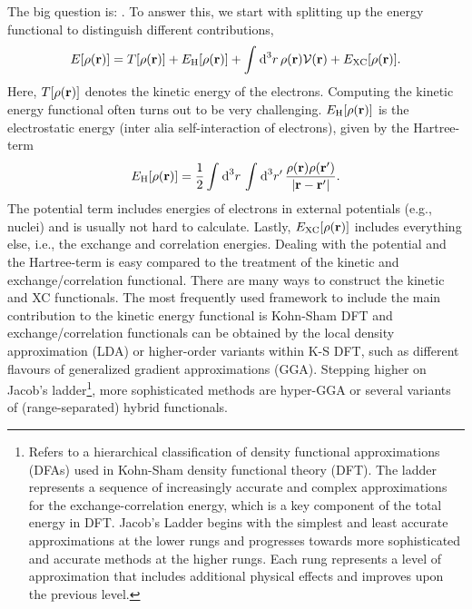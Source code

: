 \documentclass[../../main.tex]{subfiles}
\begin{document}
The big question is: . To answer this, we start with splitting up the energy functional to distinguish different contributions,
\begin{align}
	E[\rho(\textbf{r})]=T[\rho(\textbf{r})]+E_{\text{H}}[\rho(\textbf{r})]+\int_{}^{}\text{d}^3r\,\rho(\textbf{r})\mathcal{V}(\textbf{r})+E_{\text{XC}}[\rho(\textbf{r})].
\end{align}
Here, $T[\rho(\textbf{r})]$ denotes the kinetic energy of the electrons. Computing the kinetic energy functional often turns out to be very challenging. $E_{\text{H}}[\rho(\textbf{r})]$ is the electrostatic energy (inter alia self-interaction of electrons), given by the Hartree-term
\begin{align}
	E_{\text{H}}[\rho(\textbf{r})]=\frac 12\int_{}^{}\text{d}^3r\,\int_{}^{}\text{d}^3r'\,\frac{\rho(\textbf{r})\rho(\textbf{r}')}{|\textbf{r}-\textbf{r}'|}.
\end{align}
The potential term includes energies of electrons in external potentials (e.g., nuclei) and is usually not hard to calculate. Lastly, $E_{\text{XC}}[\rho(\textbf{r})]$ includes everything else, i.e., the exchange and correlation energies. Dealing with the potential and the Hartree-term is easy compared to the treatment of the kinetic and exchange/correlation functional. There are many ways to construct the kinetic and XC functionals. The most frequently used framework to include the main contribution to the kinetic energy functional is Kohn-Sham DFT and exchange/correlation functionals can be obtained by the local density approximation (LDA) or higher-order variants within K-S DFT, such as different flavours of generalized gradient approximations (GGA). Stepping higher on Jacob's ladder\footnote{Refers to a hierarchical classification of density functional approximations (DFAs) used in Kohn-Sham density functional theory (DFT). The ladder represents a sequence of increasingly accurate and complex approximations for the exchange-correlation energy, which is a key component of the total energy in DFT. Jacob's Ladder begins with the simplest and least accurate approximations at the lower rungs and progresses towards more sophisticated and accurate methods at the higher rungs. Each rung represents a level of approximation that includes additional physical effects and improves upon the previous level.}, more sophisticated methods are hyper-GGA or several variants of (range-separated) hybrid functionals.
\end{document}
